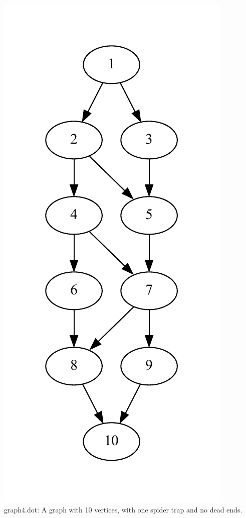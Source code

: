 \documentclass[9pt,twoside]{exam}
\begin{document}
\begin{center}
\includegraphics[scale=0.5]{graph3.pdf} \\
graph4.dot: A graph with 10 vertices, with one spider trap and no dead ends. \\

\end{center}
\end{document}
